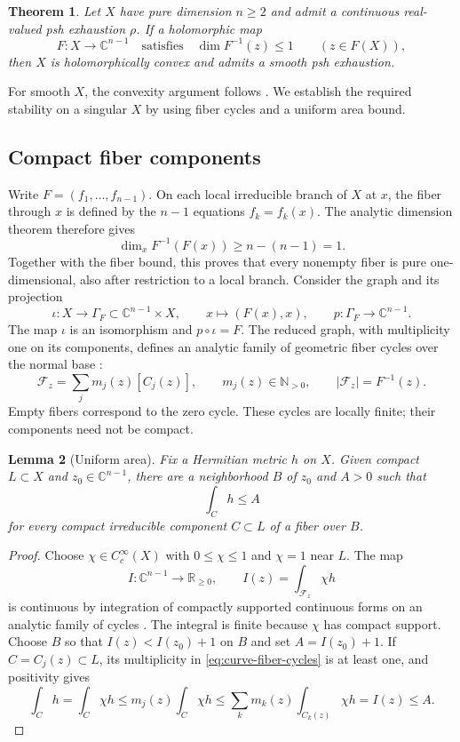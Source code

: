 \documentclass[11pt]{amsart}
\newtheorem{theorem}{Theorem}[section]
\newtheorem{lemma}[theorem]{Lemma}
\theoremstyle{definition}
\theoremstyle{remark}
\numberwithin{equation}{section}
\newcommand{\C}{\mathbb C}
\newcommand{\R}{\mathbb R}
\begin{document}
\begin{theorem}\label{thm:curve-fiber-convexity}
Let $X$ have pure dimension $n\ge2$ and admit a continuous real-valued
psh exhaustion $\rho$. If a holomorphic map
\[
 F:X\longrightarrow\C^{n-1}
 \quad\text{satisfies}\quad
 \dim F^{-1}(z)\le1\qquad(z\in F(X)),
\]
then $X$ is holomorphically convex and admits a smooth psh exhaustion.
\end{theorem}

For smooth $X$, the convexity argument follows
\cite[Corollary~4.2 and pp.~463--464]{VijituForum2022}.
We establish the required stability on a singular $X$ by using fiber
cycles and a uniform area bound.

\subsection{Compact fiber components}
Write $F=(f_1,\ldots,f_{n-1})$. On each local irreducible branch of
$X$ at $x$, the fiber through $x$ is defined by the $n-1$ equations
$f_k=f_k(x)$. The analytic dimension theorem therefore gives
\[
 \dim_x F^{-1}(F(x))\ge n-(n-1)=1.
\]
Together with the fiber bound, this proves that every nonempty fiber
is pure one-dimensional, also after restriction to a local branch.
Consider the graph and its projection
\[
 \iota:X\longrightarrow\Gamma_F\subset\C^{n-1}\times X,
 \qquad x\longmapsto(F(x),x),\qquad
 p:\Gamma_F\longrightarrow\C^{n-1}.
\]
The map $\iota$ is an isomorphism and $p\circ\iota=F$. The reduced
graph, with multiplicity one on its components, defines an analytic
family of geometric fiber cycles over the normal base
\cite[Chapter~I, \S1(b), p.~816]{BarletMagnusson1998}:
\begin{equation}\label{eq:curve-fiber-cycles}
 \mathcal F_z=\sum_jm_j(z)[C_j(z)],\qquad
 m_j(z)\in\mathbb N_{>0},\qquad
 |\mathcal F_z|=F^{-1}(z).
\end{equation}
Empty fibers correspond to the zero cycle. These cycles are locally
finite; their components need not be compact.

\begin{lemma}[Uniform area]\label{curve:lem:area}
Fix a Hermitian metric $h$ on $X$. Given compact $L\subset X$ and
$z_0\in\C^{n-1}$, there are a neighborhood $B$ of $z_0$ and $A>0$
such that
\[
 \int_C h\le A
\]
for every compact irreducible component $C\subset L$ of a fiber over $B$.
\end{lemma}
\begin{proof}
Choose $\chi\in C_c^\infty(X)$ with $0\le\chi\le1$ and $\chi=1$
near $L$. The map
\[
 I:\C^{n-1}\longrightarrow\R_{\ge0},\qquad
 I(z)=\int_{\mathcal F_z}\chi h
\]
is continuous by integration of compactly supported continuous forms
on an analytic family of cycles
\cite[Chapter~IV, Proposition~2.3.1]{BarletMagnusson2014}.
The integral is finite because $\chi$ has compact support.
Choose $B$ so that $I(z)<I(z_0)+1$ on $B$ and set $A=I(z_0)+1$.
If $C=C_j(z)\subset L$, its multiplicity in
\eqref{eq:curve-fiber-cycles} is at least one, and positivity gives
\[
 \int_C h=\int_C\chi h
 \le m_j(z)\int_C\chi h
 \le\sum_km_k(z)\int_{C_k(z)}\chi h=I(z)\le A.
\]
\end{proof}
\end{document}
